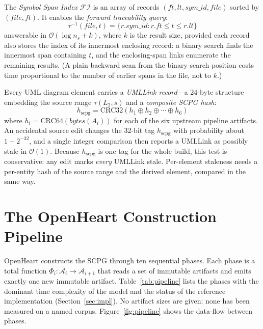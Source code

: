 \documentclass[journal,10pt,twoside]{IEEEtran}
\newcommand{\tauF}{\tau}
\newcommand{\tauI}{\tau^{-1}}
\newcommand{\FI}{\mathcal{FI}}
\newcommand{\BigO}{\mathcal{O}}
\newcommand{\hscpg}{h_{\mathrm{scpg}}}
\begin{document}
The \textit{Symbol Span Index} $\FI$ is an array of records
$(\mathit{ft}, \mathit{lt}, \mathit{sym\_id},
\mathit{file})$ sorted by $(\mathit{file}, \mathit{ft})$.
It enables the \textit{forward traceability query}:
\[
  \tauI(\mathit{file}, t) =
  \{r.\mathit{sym\_id} : r.\mathit{ft} \le t
    \le r.\mathit{lt}\}
\]
answerable in $\BigO(\log n_s + k)$, where $k$ is the result
size, provided each record also stores the index of its
innermost enclosing record: a binary search finds the
innermost span containing $t$, and the enclosing-span links
enumerate the remaining results.  (A plain backward scan from
the binary-search position costs time proportional to the
number of earlier spans in the file, not to $k$.)

\smallskip
Every UML diagram element carries a \textit{UMLLink
record}---a 24-byte structure embedding the source range
$\tauF(L_2, s)$ and a \textit{composite SCPG hash}:
\begin{equation}\label{eq:hashchain}
  \hscpg = \mathrm{CRC32}(h_1 \oplus h_2 \oplus \cdots
  \oplus h_6)
\end{equation}
where $h_i = \mathrm{CRC64}(\mathit{bytes}(A_i))$
for each of the six upstream pipeline artifacts.  An
accidental source edit changes the 32-bit tag $\hscpg$ with
probability about $1 - 2^{-32}$, and a single integer
comparison then reports a UMLLink as possibly stale in
$\BigO(1)$.  Because $\hscpg$ is one tag for the whole build,
this test is conservative: any edit marks \emph{every}
UMLLink stale.  Per-element staleness needs a per-entity hash
of the source range and the derived element, compared in the
same way.

\section{The OpenHeart Construction Pipeline}\label{sec:pipeline}

OpenHeart constructs the SCPG through ten sequential phases.
Each phase is a total function
$\Phi_i : \mathcal{A}_i \to \mathcal{A}_{i+1}$ that reads
a set of immutable artifacts and emits exactly one new
immutable artifact.  Table~\ref{tab:pipeline} lists the
phases with the dominant time complexity of the model and the
status of the reference implementation
(Section~\ref{sec:impl}).  No artifact sizes are given: none
has been measured on a named corpus.  Figure~\ref{fig:pipeline}
shows the data-flow between phases.
\end{document}
